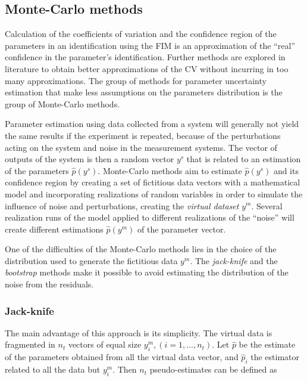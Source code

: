 \subsection{Monte-Carlo methods}
\label{sec:MonteCarloMethods}

Calculation of the coefficients of variation and the confidence region of the parameters in an identification using the FIM is an approximation of the ``real'' confidence in the parameter's identification. Further methods are explored in literature to obtain better approximations of the CV without incurring in too many approximations. The group of methods for parameter uncertainty estimation that make less assumptions on the parameters distribution is the group of Monte-Carlo methods.

Parameter estimation using data collected from a system will generally not yield the same results if the experiment is repeated, because of the perturbations acting on the system and noise in the measurement systems. The vector of outputs of the system is then a random vector $y^s$ that is related to an estimation of the parameters $\hat{p}(y^s)$. Monte-Carlo methods aim to estimate $\hat{p}(y^s)$ and its confidence region by creating a set of fictitious data vectors with a mathematical model and incorporating realizations of random variables in order to simulate the influence of noise and perturbations, creating the \emph{virtual dataset} $y^m$. Several realization runs of the model applied to different realizations of the ``noise'' will create different estimations $\hat{p}(y^m)$ of the parameter vector.

One of the difficulties of the Monte-Carlo methods lies in the choice of the distribution used to generate the fictitious data $y^m$. The \textit{jack-knife} \cite{quenouille1949approximate} and the \emph{bootstrap} \cite{efron1982jackknife} methods make it possible to avoid estimating the distribution of the noise from the residuals.

\subsubsection{Jack-knife}
\label{sec:JackKnife}

The main advantage of this approach is its simplicity. The virtual data is fragmented in $n_t$ vectors of equal size $y^m_i, (i=1, \ldots , n_t)$. Let $\hat{p}$ be the estimate of the parameters obtained from all the virtual data vector, and $\hat{p}_i$ the estimator related to all the data but $y^m_i$. Then $n_t$ pseudo-estimates can be defined as

